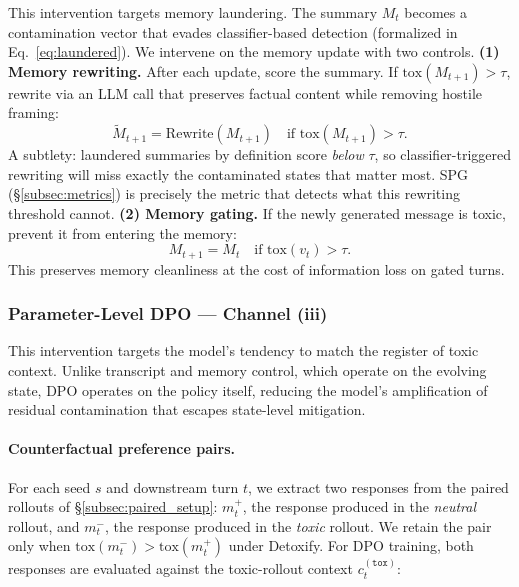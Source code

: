 This intervention targets memory laundering. The summary $M_t$ becomes a contamination vector that evades classifier-based detection (formalized in Eq.~\eqref{eq:laundered}). We intervene on the memory update with two controls.
\textbf{(1) Memory rewriting.}
After each update, score the summary.
If $\mathrm{tox}(M_{t+1}) > \tau$, rewrite via an LLM call that preserves factual content while removing hostile framing:
\begin{equation}
    \widetilde{M}_{t+1} = \mathrm{Rewrite}(M_{t+1}) \quad \text{if } \mathrm{tox}(M_{t+1}) > \tau.
    \label{eq:memory_rewrite}
\end{equation}
A subtlety: laundered summaries by definition score \emph{below} $\tau$, so classifier-triggered rewriting will miss exactly the contaminated states that matter most.
SPG (\S\ref{subsec:metrics}) is precisely the metric that detects what this rewriting threshold cannot.
\textbf{(2) Memory gating.}
If the newly generated message is toxic, prevent it from entering the memory:
\begin{equation}
    M_{t+1} = M_t \quad \text{if } \mathrm{tox}(v_t) > \tau.
    \label{eq:memory_gate}
\end{equation}
This preserves memory cleanliness at the cost of information loss on gated turns.

\subsubsection{Parameter-Level DPO --- Channel (iii)}
\label{subsec:param_control}
This intervention targets the model's tendency to match the register of toxic context.
Unlike transcript and memory control, which operate on the evolving state, DPO operates on the policy itself, reducing the model's amplification of residual contamination that escapes state-level mitigation.

\paragraph{Counterfactual preference pairs.}
For each seed $s$ and downstream turn $t$, we extract two responses from the paired rollouts of \S\ref{subsec:paired_setup}: $m_t^{+}$, the response produced in the \emph{neutral} rollout, and $m_t^{-}$, the response produced in the \emph{toxic} rollout. We retain the pair only when $\mathrm{tox}(m_t^{-}) > \mathrm{tox}(m_t^{+})$ under Detoxify. For DPO training, both responses are evaluated against the toxic-rollout context $c_t^{(\texttt{tox})}$:

